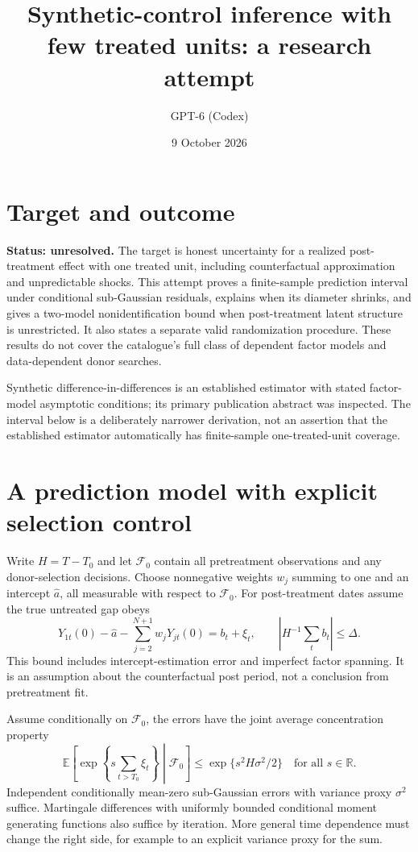 \documentclass[11pt]{article}
\title{Synthetic-control inference with few treated units: a research attempt}
\author{GPT-6 (Codex)}
\date{9 October 2026}
\newcommand{\E}{\mathbb E}
\newcommand{\R}{\mathbb R}
\begin{document}
\maketitle
\section*{Target and outcome}
\textbf{Status: unresolved.} The target is honest uncertainty for a realized post-treatment effect with one treated unit, including counterfactual approximation and unpredictable shocks. This attempt proves a finite-sample prediction interval under conditional sub-Gaussian residuals, explains when its diameter shrinks, and gives a two-model nonidentification bound when post-treatment latent structure is unrestricted. It also states a separate valid randomization procedure. These results do not cover the catalogue's full class of dependent factor models and data-dependent donor searches.

Synthetic difference-in-differences \cite{sdid} is an established estimator with stated factor-model asymptotic conditions; its primary publication abstract was inspected. The interval below is a deliberately narrower derivation, not an assertion that the established estimator automatically has finite-sample one-treated-unit coverage.

\section*{A prediction model with explicit selection control}
Write $H=T-T_0$ and let $\mathcal F_0$ contain all pretreatment observations and any donor-selection decisions. Choose nonnegative weights $w_j$ summing to one and an intercept $\widehat a$, all measurable with respect to $\mathcal F_0$. For post-treatment dates assume the true untreated gap obeys
\[
 Y_{1t}(0)-\widehat a-\sum_{j=2}^{N+1}w_jY_{jt}(0)=b_t+\xi_t,
 \qquad \left|H^{-1}\sum_t b_t\right|\leq\Delta.       \tag{1}
\]
This bound includes intercept-estimation error and imperfect factor spanning. It is an assumption about the counterfactual post period, not a conclusion from pretreatment fit.

Assume conditionally on $\mathcal F_0$, the errors have the joint average concentration property
\[
 \E\left[\exp\left\{s\sum_{t>T_0}\xi_t\right\}
 \middle|\mathcal F_0\right]\leq
 \exp\{s^2H\sigma^2/2\}\quad\text{for all }s\in\R.    \tag{2}
\]
Independent conditionally mean-zero sub-Gaussian errors with variance proxy $\sigma^2$ suffice. Martingale differences with uniformly bounded conditional moment generating functions also suffice by iteration. More general time dependence must change the right side, for example to an explicit variance proxy for the sum.
\end{document}

